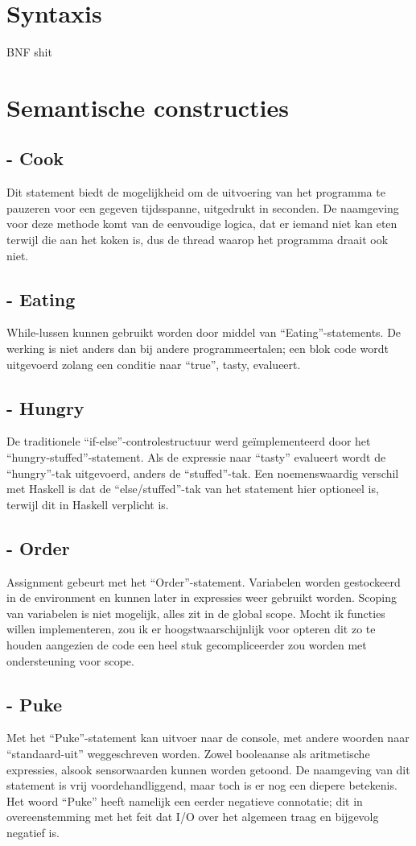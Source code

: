 \documentclass[12pt,a4paper]{report}
\begin{document}
\chapter{Syntaxis}
BNF shit

\chapter{Semantische constructies}
\section{- Cook}
Dit statement biedt de mogelijkheid om de uitvoering van het programma te pauzeren voor een gegeven tijdsspanne, uitgedrukt in seconden. De naamgeving voor deze methode komt van de eenvoudige logica, dat er iemand niet kan eten terwijl die aan het koken is, dus de thread waarop het programma draait ook niet.

\section{- Eating}
While-lussen kunnen gebruikt worden door middel van ``Eating''-statements. De werking is niet anders dan bij andere programmeertalen; een blok code wordt uitgevoerd zolang een conditie naar ``true'', tasty, evalueert.

\section{- Hungry}
De traditionele ``if-else''-controlestructuur werd geïmplementeerd door het ``hungry-stuffed''-statement. Als de expressie naar ``tasty'' evalueert wordt de ``hungry''-tak uitgevoerd, anders de ``stuffed''-tak. Een noemenswaardig verschil met Haskell is dat de ``else/stuffed''-tak van het statement hier optioneel is, terwijl dit in Haskell verplicht is.

\section{- Order}
Assignment gebeurt met het ``Order''-statement. Variabelen worden gestockeerd in de environment en kunnen later in expressies weer gebruikt worden. Scoping van variabelen is niet mogelijk, alles zit in de global scope. Mocht ik functies willen implementeren, zou ik er hoogstwaarschijnlijk voor opteren dit zo te houden aangezien de code een heel stuk gecompliceerder zou worden met ondersteuning voor scope.

\section{- Puke}
Met het ``Puke''-statement kan uitvoer naar de console, met andere woorden naar ``standaard-uit'' weggeschreven worden. Zowel booleaanse als aritmetische expressies, alsook sensorwaarden kunnen worden getoond. De naamgeving van dit statement is vrij voordehandliggend, maar toch is er nog een diepere betekenis. Het woord ``Puke'' heeft namelijk een eerder negatieve connotatie; dit in overeenstemming met het feit dat I/O over het algemeen traag en bijgevolg negatief is.
\end{document}
